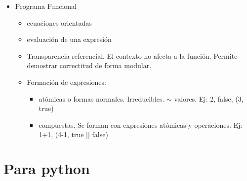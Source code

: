 \documentclass[12pt,a4paper, spanish]{article}
\begin{document}
\begin{itemize}
      \item Programa Funcional
        \begin{itemize}
          \item ecuaciones orientadas
          \item evaluación de una expresión
          \item Transparencia referencial. El contexto no afecta a la función. Permite demostrar correctitud de forma modular.
          \item Formación de expresiones:
          \begin{itemize}
            \item atómicas o formas normales. Irreducibles. $\sim$ valores. Ej: 2, false, (3, true)
            \item compuestas. Se forman con expresiones atómicas y operaciones. Ej: 1+1, (4-1, true || false)
          \end{itemize}
        \end{itemize}
\end{itemize}

\section{Para python}
\end{document}
